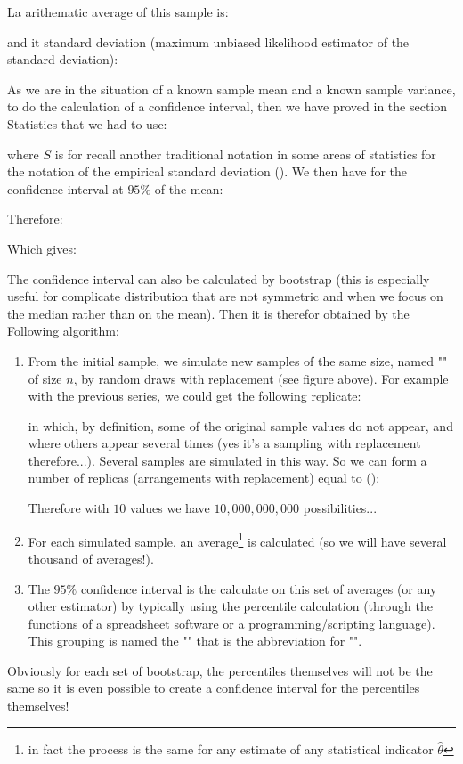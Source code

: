 	La arithematic average of this sample is:
	
	and it standard deviation (maximum unbiased likelihood estimator of the standard deviation):
	 
	As we are in the situation of a known sample mean and a known sample variance, to do the calculation of a confidence interval, then we have proved in the section Statistics that we had to use:
	
	where $S$ is for recall another traditional notation in some areas of statistics for the notation of the empirical standard deviation (). We then have for the confidence interval at $95\%$ of the mean:
		
	Therefore:
		
	Which gives:
	
	The confidence interval can also be calculated by bootstrap (this is especially useful for complicate distribution that are not symmetric and when we focus on the median rather than on the mean). Then it is therefor obtained by the Following algorithm:
	\begin{enumerate}
		\item From the initial sample, we simulate new samples of the same size, named "" of size $n$, by random draws with replacement (see figure above). For example with the previous series, we could get the following replicate:
		
		in which, by definition, some of the original sample values do not appear, and where others appear several times (yes it's a sampling with replacement therefore...). Several samples are simulated in this way. So we can form a number of replicas (arrangements with replacement) equal to ():
		
		Therefore with $10$ values we have $10,000,000,000$ possibilities...
		
		\item For each simulated sample, an average\footnote{in fact the process is the same for any estimate of any statistical indicator $\hat{\theta}$} is calculated (so we will have several thousand of averages!). 
	
		\item The $95\%$ confidence interval is the calculate on this set of averages (or any other estimator) by typically using the percentile calculation (through the functions of a spreadsheet software or a programming/scripting language). This grouping is named the "" that is the abbreviation for "".
	\end{enumerate}
	Obviously for each set of bootstrap, the percentiles themselves will not be the same so it is even possible to create a confidence interval for the percentiles themselves!
	
